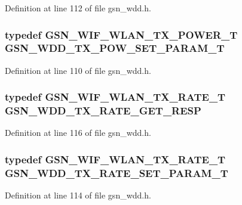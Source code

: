 Definition at line 112 of file gsn\_\-wdd.h.

\hypertarget{a00603_adbd195fb1038147499991fd7286b8c4c}{
\subsubsection[{GSN\_\-WDD\_\-TX\_\-POW\_\-SET\_\-PARAM\_\-T}]{\setlength{\rightskip}{0pt plus 5cm}typedef {\bf GSN\_\-WIF\_\-WLAN\_\-TX\_\-POWER\_\-T} {\bf GSN\_\-WDD\_\-TX\_\-POW\_\-SET\_\-PARAM\_\-T}}}
\label{a00603_adbd195fb1038147499991fd7286b8c4c}


Definition at line 110 of file gsn\_\-wdd.h.

\hypertarget{a00603_a0d7e87cd1ff0f897f58bb1c556ee7e4c}{
\subsubsection[{GSN\_\-WDD\_\-TX\_\-RATE\_\-GET\_\-RESP}]{\setlength{\rightskip}{0pt plus 5cm}typedef {\bf GSN\_\-WIF\_\-WLAN\_\-TX\_\-RATE\_\-T} {\bf GSN\_\-WDD\_\-TX\_\-RATE\_\-GET\_\-RESP}}}
\label{a00603_a0d7e87cd1ff0f897f58bb1c556ee7e4c}


Definition at line 116 of file gsn\_\-wdd.h.

\hypertarget{a00603_afcf91e1f003aac3078c1642f50f665c1}{
\subsubsection[{GSN\_\-WDD\_\-TX\_\-RATE\_\-SET\_\-PARAM\_\-T}]{\setlength{\rightskip}{0pt plus 5cm}typedef {\bf GSN\_\-WIF\_\-WLAN\_\-TX\_\-RATE\_\-T} {\bf GSN\_\-WDD\_\-TX\_\-RATE\_\-SET\_\-PARAM\_\-T}}}
\label{a00603_afcf91e1f003aac3078c1642f50f665c1}


Definition at line 114 of file gsn\_\-wdd.h.

